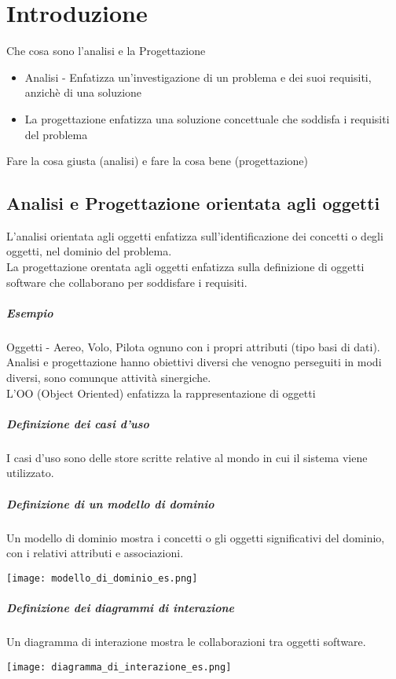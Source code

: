 \chapter{Introduzione}
Che cosa sono l'analisi e la Progettazione
\begin{itemize}
    \item Analisi - Enfatizza un'investigazione di un problema e dei suoi
    requisiti, anzichè di una soluzione
    \item La progettazione enfatizza una soluzione concettuale che soddisfa i requisiti
    del problema
\end{itemize}
Fare la cosa giusta (analisi) e fare la cosa bene (progettazione)
\section{Analisi e Progettazione orientata agli oggetti}
L'analisi orientata agli oggetti enfatizza sull'identificazione dei concetti o
degli oggetti, nel dominio del problema.
\\ La progettazione orentata agli oggetti enfatizza sulla definizione di oggetti
software che collaborano per soddisfare i requisiti.
\paragraph*{Esempio} Oggetti - Aereo, Volo, Pilota ognuno con i propri attributi
(tipo basi di dati).
Analisi e progettazione hanno obiettivi diversi che venogno perseguiti in modi diversi,
sono comunque attività sinergiche.
\\ L'OO (Object Oriented) enfatizza la rappresentazione di oggetti
\paragraph*{Definizione dei casi d'uso}
I casi d'uso sono delle store scritte relative al mondo in cui il sistema
viene utilizzato.
\paragraph*{Definizione di un modello di dominio}
Un modello di dominio mostra i concetti o gli oggetti significativi del dominio,
con i relativi attributi e associazioni.
\begin{center}
\texttt{[image: modello\_di\_dominio\_es.png]}
\end{center}
\paragraph*{Definizione dei diagrammi di interazione}
Un diagramma di interazione mostra le collaborazioni tra oggetti software.
\begin{center}
    \texttt{[image: diagramma\_di\_interazione\_es.png]}
\end{center}
